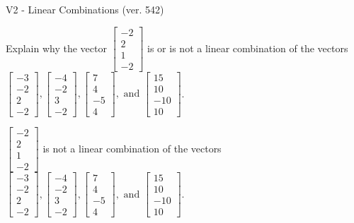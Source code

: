 \begin{exercise}
  \begin{exerciseTitle}V2 - Linear Combinations (ver. 542)\end{exerciseTitle}
  \begin{exerciseStatement}
    Explain why the vector \(\left[\begin{array}{c}
-2 \\
2 \\
1 \\
-2
\end{array}\right]\)  is or is not a linear 
	combination of the vectors \(\left[\begin{array}{c}
-3 \\
-2 \\
2 \\
-2
\end{array}\right] , \left[\begin{array}{c}
-4 \\
-2 \\
3 \\
-2
\end{array}\right] , \left[\begin{array}{c}
7 \\
4 \\
-5 \\
4
\end{array}\right] , \text{ and } \left[\begin{array}{c}
15 \\
10 \\
-10 \\
10
\end{array}\right]\).
	


  \end{exerciseStatement}
  \begin{exerciseAnswer}
   \(\left[\begin{array}{c}
-2 \\
2 \\
1 \\
-2
\end{array}\right]\) 
  	 is not  
	a linear combination of the vectors \(\left[\begin{array}{c}
-3 \\
-2 \\
2 \\
-2
\end{array}\right] , \left[\begin{array}{c}
-4 \\
-2 \\
3 \\
-2
\end{array}\right] , \left[\begin{array}{c}
7 \\
4 \\
-5 \\
4
\end{array}\right] , \text{ and } \left[\begin{array}{c}
15 \\
10 \\
-10 \\
10
\end{array}\right]\).


\end{exerciseAnswer}
\end{exercise}
